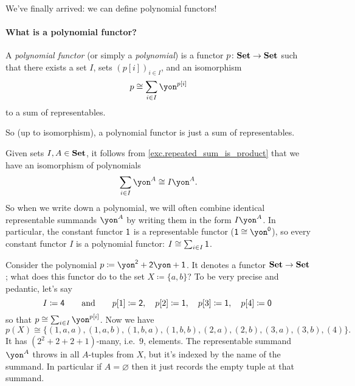 \documentclass[Book-Poly]{subfiles}
\begin{document}
We've finally arrived: we can define polynomial functors!

\paragraph{What is a polynomial functor?}

\begin{definition}
A \emph{polynomial functor} (or simply a \emph{polynomial}) is a functor $p\colon\mathbf{Set}\to\mathbf{Set}$ such that there exists a set $I$, sets $(p[i])_{i\in I}$, and an isomorphism
\[p\cong\sum_{i\in I}\yon^{p[i]}\]
to a sum of representables.
\end{definition}

So (up to isomorphism), a polynomial functor is just a sum of representables.

\begin{remark}
Given sets $I, A \in \mathbf{Set}$, it follows from \cref{exc.repeated_sum_is_product} that we have an isomorphism of polynomials
\[
    \sum_{i \in I} \yon^A \iso I\yon^A.
\]
So when we write down a polynomial, we will often combine identical representable summands $\yon^A$ by writing them in the form $I\yon^A$.
In particular, the constant functor $\textsf{1}$ is a representable functor ($\1 \iso \yon^\0$), so every constant functor $I$ is a polynomial functor: $I \cong \sum_{i \in I} \textsf{1}$.
\end{remark}

\begin{example}\label{ex.pedantic_poly_eval}
Consider the polynomial $p \coloneqq \yon^\2+\2\yon+\1$. It denotes a functor $\mathbf{Set}\to\mathbf{Set}$; what does this functor do to the set $X\coloneqq\{a,b\}$? 
To be very precise and pedantic, let's say
\[
I\coloneqq\textsf{4}\qquad\text{and}\qquad
  p[1]\coloneqq\textsf{2},\quad
  p[2]\coloneqq\textsf{1},\quad
  p[3]\coloneqq\textsf{1},\quad
  p[4]\coloneqq\textsf{0}\
\]
so that $p\cong\sum_{i\in I}\yon^{p[i]}$. Now we have
\[
p(X)\cong
\{(1,a,a),(1,a,b),(1,b,a),(1,b,b),(2,a),(2,b),(3,a),(3,b),(4)\}.
\]
It has $(2^2+2+2+1)$-many, i.e.\ $9$, elements. The representable summand $\yon^A$ throws in all $A$-tuples from $X$, but it's indexed by the name of the summand. In particular if $A=\varnothing$ then it just records the empty tuple at that summand.
\end{example}
\end{document}
